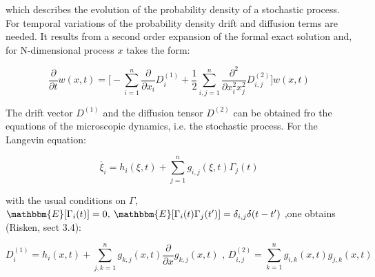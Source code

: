 \documentclass{article}
\begin{document}
which describes the evolution of the probability density of a stochastic process. For temporal variations of the probability density drift and diffusion terms are needed. It results from a second order expansion of the formal exact solution and, for N-dimensional process $x$ takes the form:

\begin{equation}
\frac{\partial}{\partial t} w(x,t) = \Big [ - \sum_{i=1}^{n} \frac{\partial}{\partial x_i} D^{(1)}_i + \frac{1}{2}  \sum_{i,j=1}^{n} \frac{\partial^2}{\partial x_i^2 x_j^2} D^{(2)}_{i,j} \Big ] w(x,t) 
\end{equation}

The drift vector $D^{(1)}$ and the diffusion tensor $D^{(2)}$ can be obtained fro the equations of the microscopic dynamics, i.e. the stochastic process. For the Langevin equation:

\begin{equation}
\dot{\xi_i} = h_i(\xi,t) + \sum_{j=1}^{n} g_{i,j}(\xi,t) \Gamma_j(t)
\end{equation}

with the usual conditions on $\Gamma$, $\mathbbm{E}[ \Gamma_i(t)]=0 \textit{,   } \mathbbm{E}[\Gamma_i(t)\Gamma_j(t')]=\delta_{i,j}\delta(t-t')$ ,one obtains (Risken, sect 3.4):
 
\begin{equation}
D_i^{(1)} = h_i(x,t) + \sum_{j,k=1}^{n} g_{k,j}(x,t) \frac{\partial}{\partial x}g_{k,j}(x,t) \textit{  ,   }  D_{i,j}^{(2)} =\sum_{k=1}^{n} g_{i,k}(x,t) g_{j,k}(x,t)
\end{equation}
\end{document}
